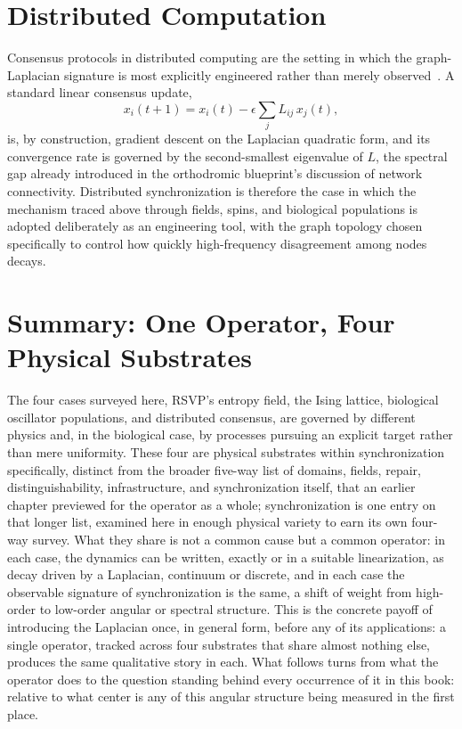 \documentclass[11pt,fleqn]{book}
\numberwithin{equation}{chapter}
\theoremstyle{plain}
\theoremstyle{definition}
\theoremstyle{remark}
\begin{document}
\section{Distributed Computation}

Consensus protocols in distributed computing are the setting in which the graph-Laplacian signature is most explicitly engineered rather than merely observed~\cite{olfatisaber2004}. A standard linear consensus update,
\begin{equation}
x_i(t+1) = x_i(t) - \epsilon \sum_{j} L_{ij}\, x_j(t),
\end{equation}
is, by construction, gradient descent on the Laplacian quadratic form, and its convergence rate is governed by the second-smallest eigenvalue of \(L\), the spectral gap already introduced in the orthodromic blueprint's discussion of network connectivity. Distributed synchronization is therefore the case in which the mechanism traced above through fields, spins, and biological populations is adopted deliberately as an engineering tool, with the graph topology chosen specifically to control how quickly high-frequency disagreement among nodes decays.

\section{Summary: One Operator, Four Physical Substrates}

The four cases surveyed here, RSVP's entropy field, the Ising lattice, biological oscillator populations, and distributed consensus, are governed by different physics and, in the biological case, by processes pursuing an explicit target rather than mere uniformity. These four are physical substrates within synchronization specifically, distinct from the broader five-way list of domains, fields, repair, distinguishability, infrastructure, and synchronization itself, that an earlier chapter previewed for the operator as a whole; synchronization is one entry on that longer list, examined here in enough physical variety to earn its own four-way survey. What they share is not a common cause but a common operator: in each case, the dynamics can be written, exactly or in a suitable linearization, as decay driven by a Laplacian, continuum or discrete, and in each case the observable signature of synchronization is the same, a shift of weight from high-order to low-order angular or spectral structure. This is the concrete payoff of introducing the Laplacian once, in general form, before any of its applications: a single operator, tracked across four substrates that share almost nothing else, produces the same qualitative story in each. What follows turns from what the operator does to the question standing behind every occurrence of it in this book: relative to what center is any of this angular structure being measured in the first place.
\end{document}
